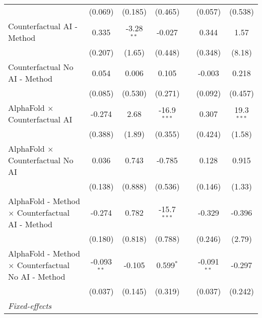 \begin{tabular}{lcccccc}
                                                              & (0.069)       & (0.185)      & (0.465)       &               & (0.057)        & (0.538)\\   
   Counterfactual AI - Method                                 & 0.335         & -3.28$^{**}$ & -0.027        &               & 0.344          & 1.57\\   
                                                              & (0.207)       & (1.65)       & (0.448)       &               & (0.348)        & (8.18)\\   
   Counterfactual No AI - Method                              & 0.054         & 0.006        & 0.105         &               & -0.003         & 0.218\\   
                                                              & (0.085)       & (0.530)      & (0.271)       &               & (0.092)        & (0.457)\\   
   AlphaFold $\times$ Counterfactual AI                       & -0.274        & 2.68         & -16.9$^{***}$ &               & 0.307          & 19.3$^{***}$\\   
                                                              & (0.388)       & (1.89)       & (0.355)       &               & (0.424)        & (1.58)\\   
   AlphaFold $\times$ Counterfactual No AI                    & 0.036         & 0.743        & -0.785        &               & 0.128          & 0.915\\   
                                                              & (0.138)       & (0.888)      & (0.536)       &               & (0.146)        & (1.33)\\   
   AlphaFold - Method $\times$ Counterfactual AI - Method     & -0.274        & 0.782        & -15.7$^{***}$ &               & -0.329         & -0.396\\   
                                                              & (0.180)       & (0.818)      & (0.788)       &               & (0.246)        & (2.79)\\   
   AlphaFold - Method $\times$ Counterfactual No AI - Method  & -0.093$^{**}$ & -0.105       & 0.599$^{*}$   &               & -0.091$^{**}$  & -0.297\\   
                                                              & (0.037)       & (0.145)      & (0.319)       &               & (0.037)        & (0.242)\\   
   \midrule
   \emph{Fixed-effects}\\

\end{tabular}
